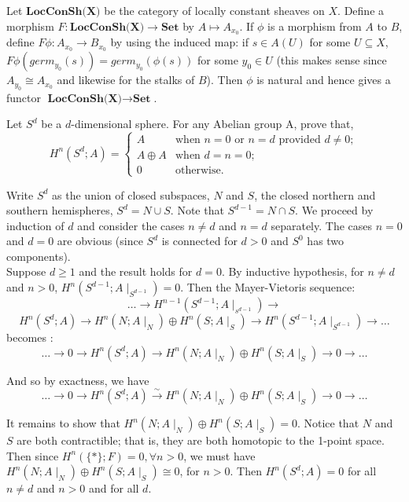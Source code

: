 Let $\textbf{LocConSh(X)}$ be the category of locally constant sheaves on $X$. Define a morphism $F: \textbf{LocConSh(X)} \rightarrow \textbf{Set}$ by $A \mapsto A_{x_0}$. If $\phi$ is a morphism from $A$ to $B$, define $F\phi:A_{x_0} \rightarrow B_{x_0}$ by using the induced map: if $s \in A(U)$ for some $U \subseteq X$, $F\phi(germ_{y_0}(s)) = germ_{y_0}(\phi(s))$ for some ${y_0} \in U$ (this makes sense since $A_{y_0} \cong A_{x_0}$ and likewise for the stalks of $B$). Then $\phi$ is natural and hence gives a functor   $\textbf{LocConSh(X)} \rightarrow \textbf{Set}$.


 Let $S^d$ be a $d$-dimensional sphere. For any Abelian group A, prove that,
\[H^n(S^d;A) = \begin{cases}
A & \text{when } n=0 \text{ or } n =d \text{ provided } d \neq 0;\\
A \oplus A & \text{when } d=n=0;\\
0 & \text{otherwise}.
\end{cases}\]

Write $S^d$ as the union of closed subspaces, $N$ and $S$, the closed northern and southern hemispheres, $S^d=N \cup S$. Note that $S^{d-1} = N \cap S$. We proceed by induction of $d$ and consider the cases $n \neq d$ and $n = d$ separately. The cases $n=0$ and $d=0$ are obvious (since $S^d$ is connected for $d>0$ and $S^0$ has two components).\\

Suppose $d \geq 1$ and the result holds for $d=0$. By inductive hypothesis, for $n \neq d$ and $n>0$, $H^n(S^{d-1};A\mid_{S^{d-1}}) =0.$ Then the Mayer-Vietoris sequence:
\[\ldots \rightarrow H^{n-1}(S^{d-1}; A\mid_{s^{d-1}}) \rightarrow\]\[  H^n(S^d;A) \rightarrow H^n(N;A\mid_N) \oplus H^n(S;A\mid_S) \rightarrow H^n(S^{d-1}; A\mid_{S^{d-1}}) \rightarrow \ldots \]
becomes :
\[ \ldots \rightarrow 0 \rightarrow H^n(S^d;A) \rightarrow H^n(N;A\mid_N) \oplus H^n(S;A\mid_S) \rightarrow 0 \rightarrow \ldots \]

And so by exactness, we have 
\[ \ldots \rightarrow 0 \rightarrow H^n(S^d;A) \xrightarrow{\sim} H^n(N;A\mid_N) \oplus H^n(S;A\mid_S) \rightarrow 0 \rightarrow \ldots \]

It remains to show that $H^n(N;A\mid_N) \oplus H^n(S;A\mid_S) =0$. Notice that $N$ and $S$ are both contractible; that is, they are both homotopic to the 1-point space. Then since  $H^n(\{*\}; F)=0, \forall n >0$, we must have \\$H^n(N;A\mid_N) \oplus H^n(S;A\mid_S) \cong 0$, for $n >0$. Then $H^n(S^d;A)=0$ for all $n \neq d$ and $n >0$ and for all $d$.\\

